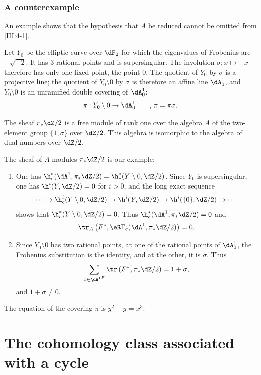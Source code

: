 \subsection{A counterexample}\label{III:4-5}

An example shows that the hypothesis that $A$ be reduced cannot be omitted
from \ref{III:4-1}.

Let $Y_0$ be the elliptic curve over $\dF_2$ for which the eigenvalues of
Frobenius are $\pm \sqrt{-2}$. It has $3$ rational points and is
supersingular. The involution $\sigma:x\mapsto -x$ therefore has only one
fixed point, the point $0$. The quotient of $Y_0$ by $\sigma$ is a projective
line; the quotient of $Y_0\setminus 0$ by $\sigma$ is therefore an affine
line $\dA_0^1$, and $Y_0\setminus 0$ is an unramified double covering of
$\dA_0^1$:
\[
  \pi:Y_0\setminus 0 \to \dA_0^1 \qquad \text{, $\pi=\pi\sigma$.}
\]

The sheaf $\pi_*\dZ/2$ is a free module of rank one over the algebra $A$ of
the two-element group $\{1,\sigma\}$ over $\dZ/2$. This algebra is isomorphic
to the algebra of dual numbers over $\dZ/2$.

The sheaf of $A$-modules $\pi_*\dZ/2$ is our example:
\begin{enumerate}[\indent a)]
  \item One has
    $\h_c^*(\dA^1,\pi_*\dZ/2) = \h_c^*(Y\setminus 0,\dZ/2)$.
    Since $Y_0$ is supersingular, one has $\h^i(Y,\dZ/2)=0$ for $i>0$, and
    the long exact sequence
    \[
      \cdots \to \h_c^i(Y\setminus 0,\dZ/2) \to \h^i(Y,\dZ/2) \to \h^i(\{0\},\dZ/2) \to \cdots
    \]
    shows that $\h_c^*(Y\setminus 0,\dZ/2)=0$. Thus
    $\h_c^*(\dA^1,\pi_*\dZ/2)=0$ and
    \[
      \tr_A\left(F^*,\eR\Gamma_c(\dA^1,\pi_*\dZ/2)\right) = 0 \text{.}
    \]
  \item Since $Y_0\setminus 0$ has two rational points, at one of the
    rational points of $\dA_0^1$, the Frobenius substitution is the identity,
    and at the other, it is $\sigma$. Thus
    \[
      \sum_{x\in {\dA^1}^F} \tr\left(F^*,\pi_*\dZ/2\right) = 1+\sigma \text{,}
    \]
    and $1+\sigma\ne 0$.
\end{enumerate}

The equation of the covering $\pi$ is $y^2-y=x^3$.



\chapter{The cohomology class associated with a cycle}\label{IV}





